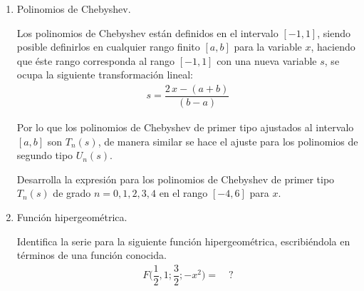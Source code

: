 \begin{enumerate}
\begin{enumerate}
\end{enumerate}

\item Polinomios de Chebyshev.
\par
\noindent
Los polinomios de Chebyshev están definidos en el intervalo $[- 1, 1]$, siendo posible definirlos en cualquier rango finito $[a, b]$ para la variable $x$, haciendo que éste rango corresponda al rango $[-1, 1]$ con una nueva variable $s$, se ocupa la siguiente transformación lineal:
\begin{align*}
s = \dfrac{2 \, x - (a + b)}{(b - a)}
\end{align*}

Por lo que los polinomios de Chebyshev de primer tipo ajustados al intervalo $[a, b]$ son $T_{n}(s)$, de manera similar se hace el ajuste para los polinomios de segundo tipo  $U_{n} (s)$. 
\noindent
\par
Desarrolla la expresión para los polinomios de Chebyshev de primer tipo $T_{n} (s)$ de grado $n = 0, 1, 2, 3, 4$ en el rango $[-4, 6]$ para $x$.
\item Función hipergeométrica.
\par
\noindent
Identifica la serie para la siguiente función hipergeométrica, escribiéndola en términos de una función conocida.
\begin{align*}
F \bigg( \dfrac{1}{2}, 1; \dfrac{3}{2}; - x^{2} \bigg) = \quad ?
\end{align*}


\end{enumerate}
